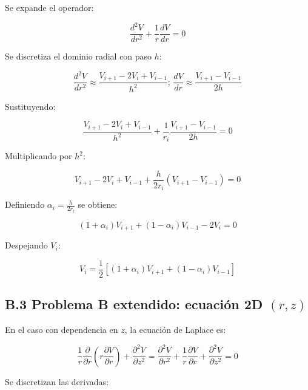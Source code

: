 \documentclass[12pt]{article}
\begin{document}
Se expande el operador:

\begin{equation}
\frac{d^2 V}{dr^2} + \frac{1}{r}\frac{dV}{dr} = 0
\end{equation}

Se discretiza el dominio radial con paso $h$:

\begin{equation}
\frac{d^2 V}{dr^2} \approx \frac{V_{i+1} - 2V_i + V_{i-1}}{h^2}
\text{;     }
\frac{dV}{dr} \approx \frac{V_{i+1} - V_{i-1}}{2h}
\end{equation}

Sustituyendo:

\begin{equation}
\frac{V_{i+1} - 2V_i + V_{i-1}}{h^2}
+
\frac{1}{r_i}\frac{V_{i+1} - V_{i-1}}{2h}
= 0
\end{equation}

Multiplicando por $h^2$:

\begin{equation}
V_{i+1} - 2V_i + V_{i-1}
+
\frac{h}{2r_i}(V_{i+1} - V_{i-1}) = 0
\end{equation}

Definiendo $\alpha_i = \frac{h}{2r_i}$ se obtiene:

\begin{equation}
(1+\alpha_i)V_{i+1} + (1-\alpha_i)V_{i-1} - 2V_i = 0
\end{equation}

Despejando $V_i$:

\begin{equation}
V_i =
\frac{1}{2}\left[
(1+\alpha_i)V_{i+1} + (1-\alpha_i)V_{i-1}
\right]
\end{equation}

\subsection*{B.3 Problema B extendido: ecuación 2D $(r,z)$}

En el caso con dependencia en $z$, la ecuación de Laplace es:

\begin{equation}
\frac{1}{r}\frac{\partial}{\partial r}\left(r \frac{\partial V}{\partial r}\right)
+
\frac{\partial^2 V}{\partial z^2}
= \frac{\partial^2 V}{\partial r^2} + \frac{1}{r}\frac{\partial V}{\partial r}
+
\frac{\partial^2 V}{\partial z^2}
= 0
\end{equation}

Se discretizan las derivadas:
\end{document}
